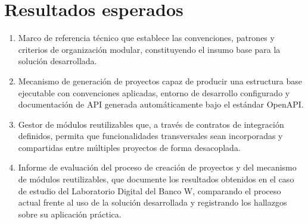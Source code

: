 
\section{Resultados esperados}

\begin{enumerate}
\item Marco de referencia técnico que establece las convenciones, patrones y criterios de organización modular, constituyendo el insumo base para la solución desarrollada.

\item Mecanismo de generación de proyectos capaz de producir una estructura base ejecutable con convenciones aplicadas, entorno de desarrollo configurado y documentación de API generada automáticamente bajo el estándar OpenAPI.

\item Gestor de módulos reutilizables que, a través de contratos de integración definidos, permita que funcionalidades transversales sean incorporadas y compartidas entre múltiples proyectos de forma desacoplada.

\item Informe de evaluación del proceso de creación de proyectos y del mecanismo de módulos reutilizables, que documente los resultados obtenidos en el caso de estudio del Laboratorio Digital del Banco W, comparando el proceso actual frente al uso de la solución desarrollada y registrando los hallazgos sobre su aplicación práctica.
\end{enumerate}